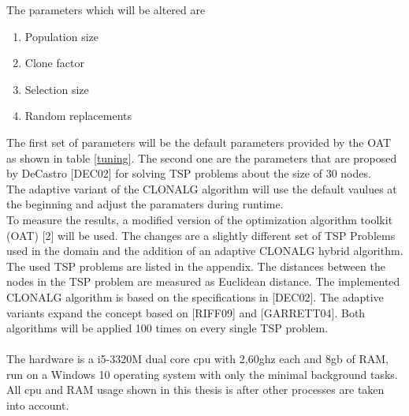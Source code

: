 \newpage
The parameters which will be altered are
\begin{enumerate}
	\item 	Population size
	\item 	Clone factor
	\item 	Selection size
	\item 	Random replacements	
\end{enumerate}
The first set of parameters will be the default parameters provided by the OAT as shown in table \ref{tuning}. The second one are the parameters that are proposed by DeCastro [DEC02] for solving TSP problems about the size of 30 nodes.\\
The adaptive variant of the CLONALG algorithm will use the default vaulues at the beginning and adjust the paramaters during runtime.\\
To measure the results, a modified version of the optimization algorithm toolkit (OAT) [2] will be used. The changes are a slightly different set of TSP Problems used in the domain and the addition of an adaptive CLONALG hybrid algorithm. The used TSP problems are listed in the appendix. The distances between the nodes in the TSP problem are measured as Euclidean distance. The implemented CLONALG algorithm is based on the specifications in [DEC02]. The adaptive variants expand the concept based on [RIFF09] and [GARRETT04].
Both algorithms will be applied 100 times on every single TSP problem.\\\\
The hardware is a i5-3320M dual core cpu with 2,60ghz each and 8gb of RAM, run on a Windows 10 operating system with only the minimal background tasks. All cpu and RAM usage shown in this thesis is after other processes are taken into account.
